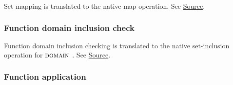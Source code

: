 \begin{mathpar}
\end{mathpar}

Set mapping is translated to the \tlap{} native map operation. See
\href{https://github.com/saltiniroberto/ssf/blob/7ea6e18093d9da3154b4e396dd435549f687e6b9/high_level/common/pythonic_code_generic.py#L91-L97}{Source}.

\subsubsection{Function domain inclusion check}


\begin{mathpar}
\end{mathpar}

Function domain inclusion checking is translated to the \tlap{} native
set-inclusion operation for $\DOMAIN$.  See
\href{https://github.com/saltiniroberto/ssf/blob/7ea6e18093d9da3154b4e396dd435549f687e6b9/high_level/common/pythonic_code_generic.py#L100-L101}{Source}.

\subsubsection{ Function application}



